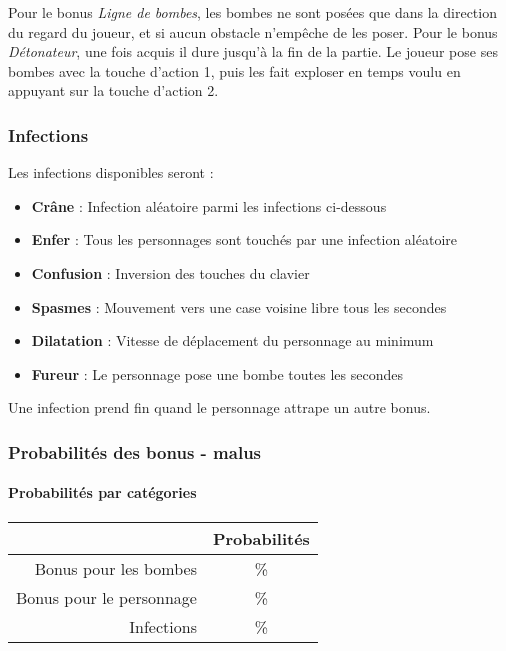 Pour le bonus \emph{Ligne de bombes}, les bombes ne sont posées que dans la direction du regard du joueur, et si aucun obstacle n'empêche de les poser. Pour le bonus \emph{Détonateur}, une fois acquis il dure jusqu'à la fin de la partie. Le joueur pose ses bombes avec la touche d'action 1, puis les fait exploser en temps voulu en appuyant sur la touche d'action 2.

\subsubsection{Infections}

Les infections disponibles seront :
\begin{itemize}
\item \textbf{Crâne} : Infection aléatoire parmi les infections ci-dessous
\item \textbf{Enfer} : Tous les personnages sont touchés par une infection aléatoire
\item \textbf{Confusion} : Inversion des touches du clavier
\item \textbf{Spasmes} : Mouvement vers une case voisine libre tous les \nbSecondes secondes
\item \textbf{Dilatation} : Vitesse de déplacement du personnage au minimum
\item \textbf{Fureur} : Le personnage pose une bombe toutes les \nbSecondes secondes
\end{itemize}

Une infection prend fin quand le personnage attrape un autre bonus.

\subsubsection{Probabilités des bonus - malus}

\paragraph{Probabilités par catégories}
\begin{center}
\begin{tabular}{|r|c|}
\hline 
& Probabilités \\ 
\hline 
Bonus pour les bombes & \% \\ 
\hline 
Bonus pour le personnage & \% \\ 
\hline 
Infections & \% \\ 
\hline 
\end{tabular} 
\end{center}

